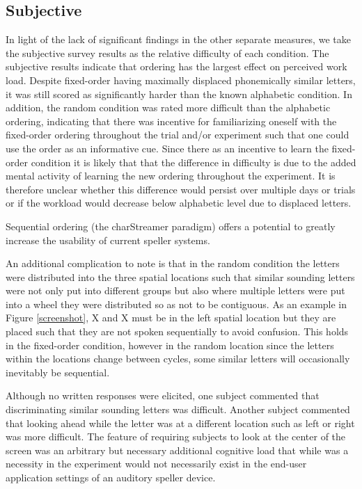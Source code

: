 \documentclass[10pt]{article}
\begin{document}
\subsection{Subjective}
In light of the lack of significant findings in the other separate
measures, we take the subjective survey results as the relative
difficulty of each condition.  The subjective results indicate that
ordering has the largest effect on perceived work load. Despite
fixed-order having maximally displaced phonemically similar letters,
it was still scored as significantly harder than the known
alphabetic condition.  In addition, the random condition was rated
more difficult than the alphabetic ordering, indicating that there
was incentive for familiarizing oneself with the fixed-order
ordering throughout the trial and/or experiment such that one could
use the order as an informative cue.  Since there as an incentive to
learn the fixed-order condition it is likely that that the
difference in difficulty is due to the added mental activity of
learning the new ordering throughout the experiment. It is therefore
unclear whether this difference would persist over multiple days or
trials or if the workload would decrease below alphabetic level due
to displaced letters.

Sequential ordering (the charStreamer paradigm) offers a potential to
greatly increase the usability of current speller systems.

An additional complication to note is that in the
random condition the letters were distributed into the three
spatial locations such that similar sounding letters were not only
put into different groups but also where multiple letters were put
into a wheel they were distributed so as not to be contiguous.  As
an example in Figure \ref{screenshot}, X and X must be in the left
spatial location but they are placed such that they are not spoken
sequentially to avoid confusion.  This holds in the fixed-order
condition, however in the random location since the letters within
the locations change between cycles, some similar letters will
occasionally inevitably be sequential. 

Although no written responses were elicited, one subject commented
that discriminating similar sounding letters was difficult.  Another
subject commented that looking ahead while the letter was at a
different location such as left or right was more difficult.  The
feature of requiring subjects to look at the center of the screen
was an arbitrary but necessary additional cognitive load that while
was a necessity in the experiment would not necessarily exist in the
end-user application settings of an auditory speller device.
\end{document}
